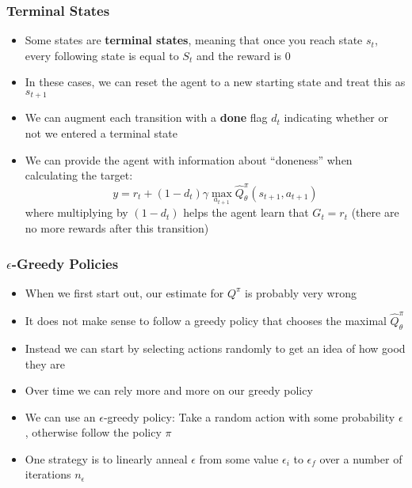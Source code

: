 \documentclass{beamer}
\begin{document}
\begin{frame}
  \frametitle{Terminal States}
  \begin{itemize}
    \item Some states are \textbf{terminal states}, meaning that once you reach state $s_t$, every following state is equal to $S_t$ and the reward is $0$
    \item In these cases, we can reset the agent to a new starting state and treat this as $s_{t+1}$
    \item We can augment each transition with a \textbf{done} flag $d_t$ indicating whether or not we entered a terminal state
    \item We can provide the agent with information about ``doneness'' when calculating the target:
    $$y = r_t + (1-d_t) \gamma \max_{a_{t+1}} \widehat{Q}_{\theta}^\pi (s_{t+1}, a_{t+1})$$
    where multiplying by $(1 - d_t)$ helps the agent learn that $G_t = r_t$ (there are no more rewards after this transition)
  \end{itemize}
\end{frame}

\begin{frame}
  \frametitle{$\epsilon$-Greedy Policies}
  \begin{itemize}
    \item When we first start out, our estimate for $Q^\pi$ is probably very wrong
    \item It does not make sense to follow a greedy policy that chooses the maximal $\widehat{Q}_{\theta}^\pi$
    \item Instead we can start by selecting actions randomly to get an idea of how good they are
    \item Over time we can rely more and more on our greedy policy
    \item We can use an $\epsilon$-greedy policy: Take a random action with some probability $\epsilon$, otherwise follow the policy $\pi$
    \item One strategy is to linearly anneal $\epsilon$ from some value $\epsilon_i$ to $\epsilon_f$ over a number of iterations $n_\epsilon$
  \end{itemize}
\end{frame}
\end{document}
